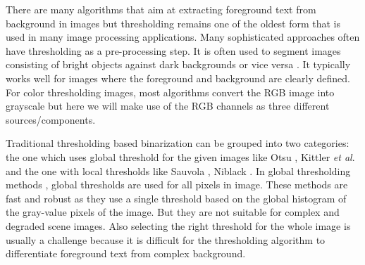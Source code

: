There are many algorithms that aim at extracting foreground text from background in images but thresholding remains one of
the oldest form that is used in many image processing applications. Many sophisticated approaches often have thresholding as a pre-processing step. 
It is often used to segment images consisting of bright objects against dark backgrounds or vice versa \cite{A1,A3,A4}.
It typically works well for images where the foreground and background are clearly defined.
For color thresholding images, most algorithms convert the 
RGB image into grayscale but here we will make use of the RGB channels as three different sources/components. 

Traditional thresholding based binarization can be grouped into two categories: the one which uses global
threshold for the given images like Otsu \cite{A2}, Kittler {\em et al}. 
\cite{A5} and the one with local thresholds like Sauvola \cite{A6},
Niblack \cite{A9}. In global thresholding methods \cite{A2,A7}, global thresholds are
used for all pixels in image. These methods are fast and robust as
they use a single threshold based on the global histogram of the gray-value pixels of the image.
But they are not suitable for complex
and degraded scene images. 
Also selecting the right threshold for the whole image is usually a challenge 
because it is difficult for the thresholding
algorithm to differentiate foreground text from complex background.

